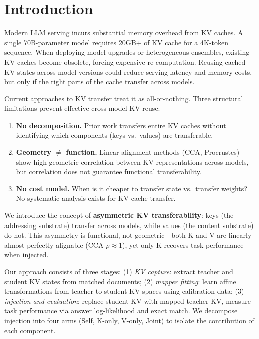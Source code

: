 
\section{Introduction}

Modern LLM serving incurs substantial memory overhead from KV caches.
A single 70B-parameter model requires 20GB+ of KV cache for a 4K-token sequence.
When deploying model upgrades or heterogeneous ensembles, existing KV caches become obsolete,
forcing expensive re-computation.
Reusing cached KV states across model versions could reduce serving latency and memory costs,
but only if the right parts of the cache transfer across models.

Current approaches to KV transfer treat it as all-or-nothing.
Three structural limitations prevent effective cross-model KV reuse:
\begin{enumerate}
  \item \textbf{No decomposition.} Prior work transfers entire KV caches without identifying
    which components (keys vs.\ values) are transferable.
  \item \textbf{Geometry $\neq$ function.} Linear alignment methods (CCA, Procrustes)
    show high geometric correlation between KV representations across models,
    but correlation does not guarantee functional transferability.
  \item \textbf{No cost model.} When is it cheaper to transfer state vs.\ transfer weights?
    No systematic analysis exists for KV cache transfer.
\end{enumerate}

We introduce the concept of \textbf{asymmetric KV transferability}:
keys (the addressing substrate) transfer across models,
while values (the content substrate) do not.
This asymmetry is functional, not geometric---both K and V are linearly almost perfectly
alignable (CCA $\rho \approx 1$), yet only K recovers task performance when injected.

Our approach consists of three stages:
(1) \emph{KV capture}: extract teacher and student KV states from matched documents;
(2) \emph{mapper fitting}: learn affine transformations from teacher to student KV spaces
using calibration data;
(3) \emph{injection and evaluation}: replace student KV with mapped teacher KV,
measure task performance via answer log-likelihood and exact match.
We decompose injection into four arms (Self, K-only, V-only, Joint) to isolate
the contribution of each component.

